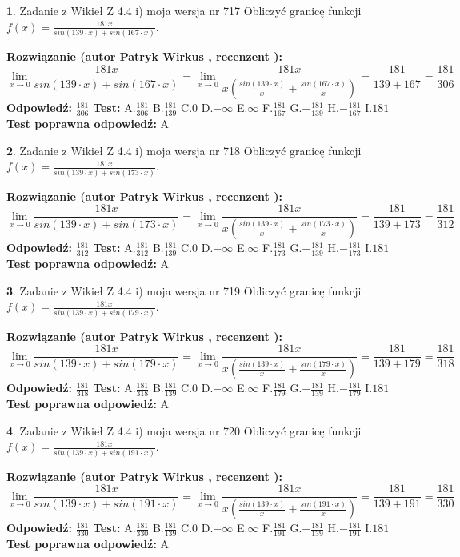 \documentclass[12pt, a4paper]{article}
\theoremstyle{definition} %
\newtheorem{zad}{}
\newcommand{\zadStart}[1]{\begin{zad}#1\newline}
\newcommand{\zadStop}{\end{zad}}
\newcommand{\rozwStart}[2]{\noindent \textbf{Rozwiązanie (autor #1 , recenzent #2): }\newline}
\newcommand{\rozwStop}{\newline}
\newcommand{\odpStart}{\noindent \textbf{Odpowiedź:}\newline}
\newcommand{\odpStop}{\newline}
\newcommand{\testStart}{\noindent \textbf{Test:}\newline}
\newcommand{\testStop}{\newline}
\newcommand{\kluczStart}{\noindent \textbf{Test poprawna odpowiedź:}\newline}
\newcommand{\kluczStop}{\newline}
\begin{document}
\zadStart{Zadanie z Wikieł Z 4.4 i) moja wersja nr 717}
Obliczyć granicę funkcji $f(x)=\frac{181x}{sin(139\cdot x) +sin(167\cdot x)}$.
\zadStop
\rozwStart{Patryk Wirkus}{}
$$\lim\limits_{x\to 0}\frac{181x}{sin(139\cdot x) +sin(167\cdot x)}=\lim\limits_{x\to 0}\frac{181x}{x(\frac{sin(139\cdot x)}{x}+\frac{sin(167\cdot x)}{x})}=\frac{181}{139+167} = \frac{181}{306}$$
\rozwStop
\odpStart
$\frac{181}{306}$
\odpStop
\testStart
A.$\frac{181}{306}$
B.$\frac{181}{139}$
C.$0$
D.$-\infty$
E.$\infty$
F.$\frac{181}{167}$
G.$-\frac{181}{139}$
H.$-\frac{181}{167}$
I.$181$
\testStop
\kluczStart
A
\kluczStop



\zadStart{Zadanie z Wikieł Z 4.4 i) moja wersja nr 718}
Obliczyć granicę funkcji $f(x)=\frac{181x}{sin(139\cdot x) +sin(173\cdot x)}$.
\zadStop
\rozwStart{Patryk Wirkus}{}
$$\lim\limits_{x\to 0}\frac{181x}{sin(139\cdot x) +sin(173\cdot x)}=\lim\limits_{x\to 0}\frac{181x}{x(\frac{sin(139\cdot x)}{x}+\frac{sin(173\cdot x)}{x})}=\frac{181}{139+173} = \frac{181}{312}$$
\rozwStop
\odpStart
$\frac{181}{312}$
\odpStop
\testStart
A.$\frac{181}{312}$
B.$\frac{181}{139}$
C.$0$
D.$-\infty$
E.$\infty$
F.$\frac{181}{173}$
G.$-\frac{181}{139}$
H.$-\frac{181}{173}$
I.$181$
\testStop
\kluczStart
A
\kluczStop



\zadStart{Zadanie z Wikieł Z 4.4 i) moja wersja nr 719}
Obliczyć granicę funkcji $f(x)=\frac{181x}{sin(139\cdot x) +sin(179\cdot x)}$.
\zadStop
\rozwStart{Patryk Wirkus}{}
$$\lim\limits_{x\to 0}\frac{181x}{sin(139\cdot x) +sin(179\cdot x)}=\lim\limits_{x\to 0}\frac{181x}{x(\frac{sin(139\cdot x)}{x}+\frac{sin(179\cdot x)}{x})}=\frac{181}{139+179} = \frac{181}{318}$$
\rozwStop
\odpStart
$\frac{181}{318}$
\odpStop
\testStart
A.$\frac{181}{318}$
B.$\frac{181}{139}$
C.$0$
D.$-\infty$
E.$\infty$
F.$\frac{181}{179}$
G.$-\frac{181}{139}$
H.$-\frac{181}{179}$
I.$181$
\testStop
\kluczStart
A
\kluczStop



\zadStart{Zadanie z Wikieł Z 4.4 i) moja wersja nr 720}
Obliczyć granicę funkcji $f(x)=\frac{181x}{sin(139\cdot x) +sin(191\cdot x)}$.
\zadStop
\rozwStart{Patryk Wirkus}{}
$$\lim\limits_{x\to 0}\frac{181x}{sin(139\cdot x) +sin(191\cdot x)}=\lim\limits_{x\to 0}\frac{181x}{x(\frac{sin(139\cdot x)}{x}+\frac{sin(191\cdot x)}{x})}=\frac{181}{139+191} = \frac{181}{330}$$
\rozwStop
\odpStart
$\frac{181}{330}$
\odpStop
\testStart
A.$\frac{181}{330}$
B.$\frac{181}{139}$
C.$0$
D.$-\infty$
E.$\infty$
F.$\frac{181}{191}$
G.$-\frac{181}{139}$
H.$-\frac{181}{191}$
I.$181$
\testStop
\kluczStart
A
\kluczStop
\end{document}
